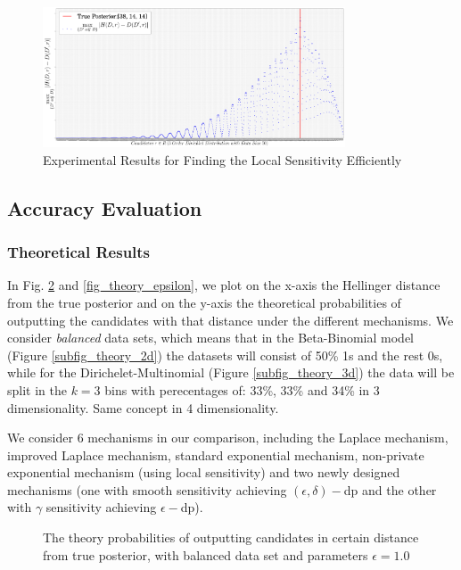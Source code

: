 \documentclass{article}
\begin{document}
\begin{figure}[ht]
\centering
\includegraphics[width=0.8\textwidth]{efficiency}
\caption{Experimental Results for Finding the Local Sensitivity Efficiently}
\label{fig_efficiency}
\end{figure}

\subsection{Accuracy Evaluation}
\subsubsection{Theoretical Results}
In Fig. \ref{fig_theory} and \ref{fig_theory_epsilon}, we plot on the x-axis the Hellinger distance from the true posterior and on the y-axis the theoretical probabilities of outputting the candidates with that distance under the different mechanisms. We consider \emph{balanced} data sets, which means that in the Beta-Binomial model (Figure \ref{subfig_theory_2d}) the datasets will consist of 50\% 1s and the rest 0s, while for the
Dirichelet-Multinomial (Figure  \ref{subfig_theory_3d})
the data will be split in the $k=3$ bins with perecentages of: 33\%, 33\% and 34\% in 3 dimensionality. Same concept in 4 dimensionality.

We consider 6 mechanisms in our comparison, including the Laplace mechanism, improved Laplace mechanism, standard exponential mechanism, non-private exponential mechanism (using local sensitivity) and two newly designed mechanisms (one with smooth sensitivity achieving $(\epsilon, \delta)-$dp and the other with $\gamma$ sensitivity achieving $\epsilon-$dp).

\begin{figure}
\begin{center}
\centering
\caption{The theory probabilities of outputting candidates in certain distance from true posterior, with balanced data set and parameters $\epsilon = 1.0$}
\label{fig_theory}
\end{center}
\end{figure}
\end{document}
